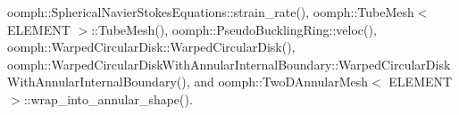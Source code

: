 oomph\+::\+Spherical\+Navier\+Stokes\+Equations\+::strain\+\_\+rate(), oomph\+::\+Tube\+Mesh$<$ E\+L\+E\+M\+E\+N\+T $>$\+::\+Tube\+Mesh(), oomph\+::\+Pseudo\+Buckling\+Ring\+::veloc(), oomph\+::\+Warped\+Circular\+Disk\+::\+Warped\+Circular\+Disk(), oomph\+::\+Warped\+Circular\+Disk\+With\+Annular\+Internal\+Boundary\+::\+Warped\+Circular\+Disk\+With\+Annular\+Internal\+Boundary(), and oomph\+::\+Two\+D\+Annular\+Mesh$<$ E\+L\+E\+M\+E\+N\+T $>$\+::wrap\+\_\+into\+\_\+annular\+\_\+shape().

